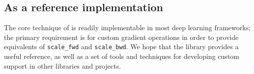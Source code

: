 \subsection{As a reference implementation}

The core technique of \umup{} is readily implementable in most deep learning frameworks; the primary requirement is for custom gradient operations in order to provide equivalents of \texttt{scale\_fwd} and \texttt{scale\_bwd}. We hope that the library provides a useful reference, as well as a set of tools and techniques for developing custom \umup{} support in other libraries and projects.
